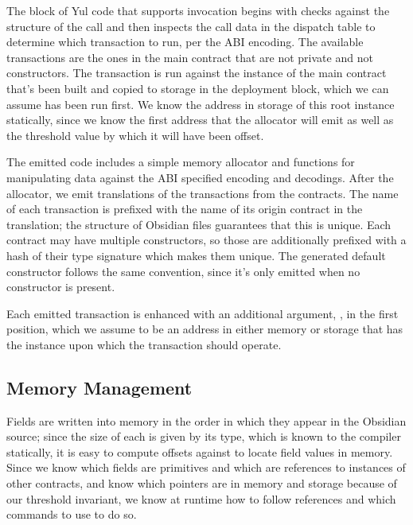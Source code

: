 The block of Yul code that supports invocation begins with checks against the structure of the call and then
inspects the call data in the dispatch table to determine which transaction
to run, per the ABI encoding. The available transactions are the ones in
the main contract that are not private and not constructors. The
transaction is run against the instance of the main contract that's been
built and copied to storage in the deployment block, which we can assume
has been run first. We know the address in storage of this root instance
statically, since we know the first address that the allocator will emit as
well as the threshold value by which it will have been offset.

The emitted code includes a simple memory allocator and functions for
manipulating data against the ABI specified encoding and decodings.  After the allocator, we emit translations of the transactions from the
contracts. The name of each transaction is prefixed with the name of its
origin contract in the translation; the structure of Obsidian files
guarantees that this is unique. Each contract may have multiple
constructors, so those are additionally prefixed with a hash of their type
signature which makes them unique. The generated default constructor
follows the same convention, since it's only emitted when no constructor is
present.

Each emitted transaction is enhanced with an additional argument, , in the first position, which we assume to be an address
in either memory or storage that has the instance upon which the
transaction should operate. 

\subsection{Memory Management}
Fields are written into memory in the order in
which they appear in the Obsidian source; since the size of each is given
by its type, which is known to the compiler statically, it is easy to
compute offsets against  to locate field values in
memory. Since we know which fields are primitives and which are references
to instances of other contracts, and know which pointers are in memory and
storage because of our threshold invariant, we know at runtime how to
follow references and which commands to use to do so.

